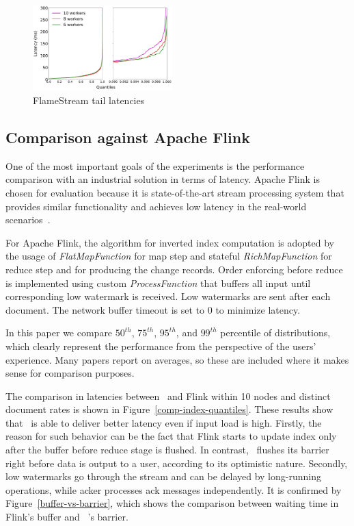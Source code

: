 \begin{figure}[htbp]
  \centering
  \includegraphics[width=0.48\textwidth]{pics/fs-index-quantiles}
  \caption{FlameStream tail latencies}
  \label {fs-index-quantiles}
\end{figure}

\subsection{Comparison against Apache Flink}

One of the most important goals of the experiments is the performance comparison with an industrial solution in terms of latency. Apache Flink is chosen for evaluation because it is state-of-the-art stream processing system that provides similar functionality and achieves low latency in the real-world scenarios~\cite{S7530084}. 

For Apache Flink, the algorithm for inverted index computation is adopted by the usage of {\it FlatMapFunction} for map step and stateful {\it RichMapFunction} for reduce step and for producing the change records. Order enforcing before reduce is implemented using custom {\it ProcessFunction} that buffers all input until corresponding low watermark is received. Low watermarks are sent after each document. The network buffer timeout is set to 0 to minimize latency.

In this paper we compare $50^{th}$, $75^{th}$, $95^{th}$, and $99^{th}$ percentile of distributions, which clearly represent the performance from the perspective of the users' experience. Many papers report on averages, so these are included where it makes sense for comparison purposes. 

The comparison in latencies between \FlameStream\ and Flink within 10 nodes and distinct document rates is shown in Figure~\ref{comp-index-quantiles}. These results show that \FlameStream\ is able to deliver better latency even if input load is high. Firstly, the reason for such behavior can be the fact that Flink starts to update index only after the buffer before reduce stage is flushed. In contrast, \FlameStream\ flushes its barrier right before data is output to a user, according to its optimistic nature. Secondly, low watermarks go through the stream and can be delayed by long-running operations, while acker processes ack messages independently. It is confirmed by Figure~\ref{buffer-vs-barrier}, which shows the comparison between waiting time in Flink's buffer and \FlameStream\ 's barrier. 
